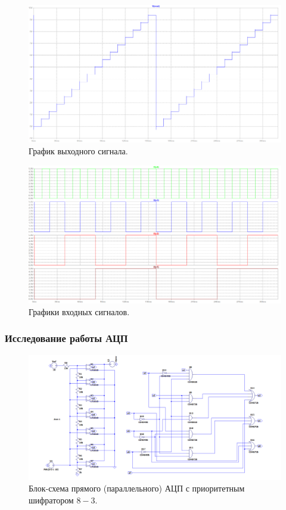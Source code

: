 \documentclass[12pt]{article}
\begin{document}
\begin{figure}[H]
    \centering
    \includegraphics[width=\textwidth]{dac_out.png}
    \caption{График выходного сигнала.}
    \label{fig:dac_out}
\end{figure}

\begin{figure}[H]
    \centering
    \includegraphics[width=\textwidth]{dac_bits.png}
    \caption{Графики входных сигналов.}
    \label{fig:dac_bits}
\end{figure}

\subsubsection*{Исследование работы АЦП}

\begin{figure}[H]
    \centering
    \includegraphics[width=\textwidth]{adc_scheme.png}
    \caption{Блок-схема прямого (параллельного) АЦП с приоритетным шифратором $8-3$.}
    \label{fig:adc_scheme}
\end{figure}
\end{document}
